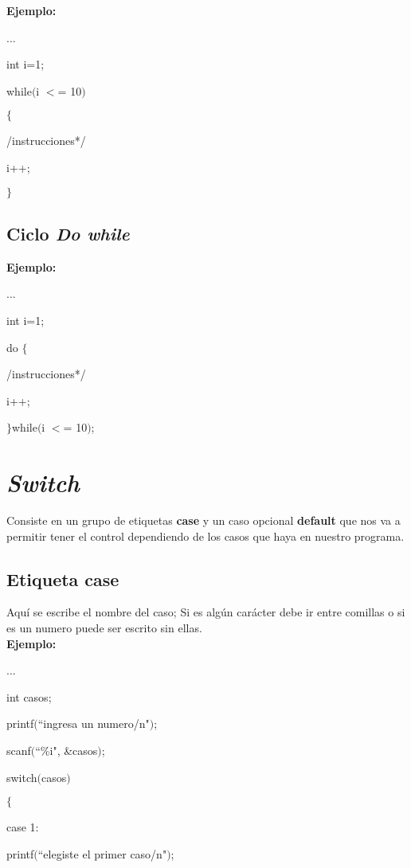 \documentclass[]{article}
\begin{document}
	\textbf{Ejemplo:\\}
	
	...
	
	int i=1;
	
	while$($i $<$= 10$)$
	
	$\lbrace$
	
	\slash*instrucciones*\slash
	
	i++;
	
	$\rbrace$
	
	
	
	\subsection{Ciclo \textit{Do while}}
	
	\textbf{Ejemplo:\\}
	
	...
	
	int i=1;
	
	do $\lbrace$
	
	\slash*instrucciones*\slash
	
	i++;
	
	$\rbrace$while$($i $<$= 10$)$;
	
	\section{\textit{Switch}}
	Consiste en un grupo de etiquetas \textbf{case} y un caso opcional \textbf{default} que nos va a permitir tener el control dependiendo de los casos que haya en nuestro programa.
	
	\subsection{Etiqueta case}
	Aquí se escribe el nombre del caso; Si es algún carácter debe ir entre comillas o si es un numero puede ser escrito sin ellas.\\
	
	\textbf{Ejemplo:\\}
	
	...
	
	int casos;
	
	printf$($``ingresa un numero\slash n"$)$;
	
	scanf$($``\%i", \&casos$)$;
	
	switch$($casos$)$
	
	$\lbrace$
	
	case 1:
	
	printf$($``elegiste el primer caso\slash n"$)$;
	
\end{document}
